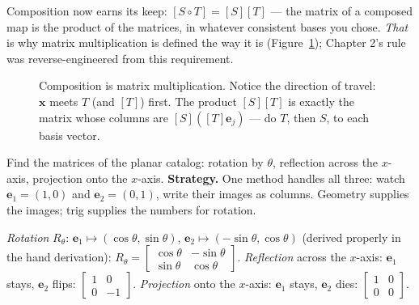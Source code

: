Composition now earns its keep: $[S\circ T]=[S][T]$ — the matrix of a composed map is the product of the matrices, in whatever consistent bases you chose. \emph{That} is why matrix multiplication is defined the way it is (Figure~\ref{fig:composition}); Chapter 2's rule was reverse-engineered from this requirement.

\begin{figure}[htbp]
\centering

\caption{Composition is matrix multiplication. Notice the direction of travel: $\mathbf x$ meets $T$ (and $[T]$) first. The product $[S][T]$ is exactly the matrix whose columns are $[S]([T]\mathbf e_j)$ — do $T$, then $S$, to each basis vector.}
\label{fig:composition}
\end{figure}

\begin{example}\label{ex:gallery}
Find the matrices of the planar catalog: rotation by $\theta$, reflection across the $x$-axis, projection onto the $x$-axis.
\textbf{Strategy.} One method handles all three: watch $\mathbf e_1=(1,0)$ and $\mathbf e_2=(0,1)$, write their images as columns. Geometry supplies the images; trig supplies the numbers for rotation.
\begin{solution}
\emph{Rotation} $R_\theta$: $\mathbf e_1\mapsto(\cos\theta,\sin\theta)$, $\mathbf e_2\mapsto(-\sin\theta,\cos\theta)$ (derived properly in the hand derivation):
\(
R_\theta=\begin{bmatrix}\cos\theta&-\sin\theta\\ \sin\theta&\cos\theta\end{bmatrix}.
\)
\emph{Reflection} across the $x$-axis: $\mathbf e_1$ stays, $\mathbf e_2$ flips: $\begin{bmatrix}1&0\\0&-1\end{bmatrix}$.
\emph{Projection} onto the $x$-axis: $\mathbf e_1$ stays, $\mathbf e_2$ dies: $\begin{bmatrix}1&0\\0&0\end{bmatrix}$.
\end{solution}
\end{example}

